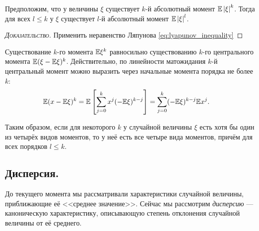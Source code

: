 \documentclass[../main.tex]{subfiles}
\begin{document}
\begin{remrk}
 \label{remark:high_moment_exists_then_low_moment_exists}
 Предположим, что у величины $ \xi $ существует $ k $-й абсолютный момент $ \mathbb E \left| \xi \right|^{k} $. Тогда для всех $ l \leqslant k $ у $ \xi $ существует $ l $-й абсолютный момент $ \mathbb E \left| \xi \right|^{l} $.
\end{remrk}
\begin{proof}[\normalfont\textsc{Доказательство}]
 Применить неравенство Ляпунова \eqref{eq:lyapunov_inequality}
\end{proof}

\begin{remrk}
 Существование $ k $-го момента $ \mathbb E\xi^{k} $ равносильно существованию $ k $-го центрального момента $ \mathbb E(\xi-\mathbb E\xi)^{k} $. Действительно, по линейности матожидания $ k $-й центральный момент можно выразить через начальные момента порядка не более $ k $:
 \begin{align*}
  \mathbb E(x-\mathbb E\xi)^{k} &= \mathbb E \left[ \sum_{j=0}^{k} x^{j}(-\mathbb E\xi)^{k-j} \right] = \sum_{j=0}^{k}(-\mathbb E\xi)^{k-j} \mathbb E x^{j}.
 \end{align*}
\end{remrk}

Таким образом, если для некоторого $ k $ у случайной величины $ \xi $ есть хотя бы один из четырёх видов моментов, то у неё есть все четыре вида моментов, причём для всех порядков $ l \leqslant k $.

\subsection{Дисперсия.}

До текущего момента мы рассматривали характеристики случайной величины, приближающие её <<среднее значение>>. Сейчас мы рассмотрим \textit{дисперсию} --- каноническую характеристику, описывающую степень отклонения случайной величины от её среднего.
\end{document}
